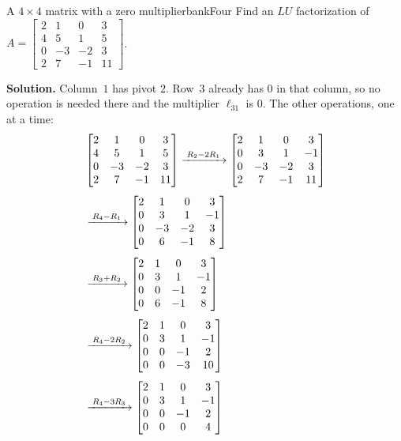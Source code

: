 \documentclass[11pt]{article}
\begin{document}
\begin{exmp}{A $4\times4$ matrix with a zero multiplier}{bankFour}
Find an $LU$ factorization of $A=\begin{bmatrix}2&1&0&3\\4&5&1&5\\0&-3&-2&3\\2&7&-1&11\end{bmatrix}$.

\textbf{Solution.} Column~$1$ has pivot $2$. Row~$3$ already has $0$ in that column, so no operation is needed there and the multiplier $\ell_{31}$ is $0$. The other operations, one at a time:
\begin{align*}
&\begin{bmatrix}2&1&0&3\\4&5&1&5\\0&-3&-2&3\\2&7&-1&11\end{bmatrix}
\xrightarrow{\;R_2-2R_1\;}
\begin{bmatrix}2&1&0&3\\0&3&1&-1\\0&-3&-2&3\\2&7&-1&11\end{bmatrix}\\[4pt]
&\xrightarrow{\;R_4-R_1\;}
\begin{bmatrix}2&1&0&3\\0&3&1&-1\\0&-3&-2&3\\0&6&-1&8\end{bmatrix}\\[4pt]
&\xrightarrow{\;R_3+R_2\;}
\begin{bmatrix}2&1&0&3\\0&3&1&-1\\0&0&-1&2\\0&6&-1&8\end{bmatrix}\\[4pt]
&\xrightarrow{\;R_4-2R_2\;}
\begin{bmatrix}2&1&0&3\\0&3&1&-1\\0&0&-1&2\\0&0&-3&10\end{bmatrix}\\[4pt]
&\xrightarrow{\;R_4-3R_3\;}
\begin{bmatrix}2&1&0&3\\0&3&1&-1\\0&0&-1&2\\0&0&0&4\end{bmatrix}
\end{align*}

\end{exmp}
\end{document}
